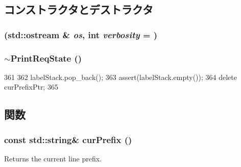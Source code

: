 \subsection{コンストラクタとデストラクタ}
\hypertarget{classPacket_1_1PrintReqState_a2e853be0fa1049895136c8bfae01446f}{
\subsubsection[{PrintReqState}]{ (std::ostream \& {\em os}, \/  int {\em verbosity} = {})}}
\label{classPacket_1_1PrintReqState_a2e853be0fa1049895136c8bfae01446f}
\hypertarget{classPacket_1_1PrintReqState_ac45cb047672396b55a3e6a96415c4f61}{
\subsubsection[{$\sim$PrintReqState}]{\setlength{\rightskip}{0pt plus 5cm}$\sim${\bf PrintReqState} ()}}
\label{classPacket_1_1PrintReqState_ac45cb047672396b55a3e6a96415c4f61}



\begin{DoxyCode}
361 {
362     labelStack.pop_back();
363     assert(labelStack.empty());
364     delete curPrefixPtr;
365 }
\end{DoxyCode}


\subsection{関数}
\hypertarget{classPacket_1_1PrintReqState_ad5d5a6a6da677a4961b84d82bbe05153}{
\subsubsection[{curPrefix}]{\setlength{\rightskip}{0pt plus 5cm}const std::string\& curPrefix ()}}
\label{classPacket_1_1PrintReqState_ad5d5a6a6da677a4961b84d82bbe05153}
Returns the current line prefix. 


